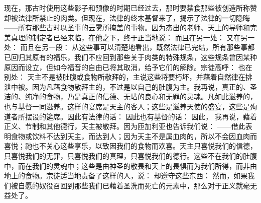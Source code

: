 现在，那古时使用这些影子和预像的时期已经过去，那时要禁食那些被创造所称赞却被法律所禁止的肉类。但现在，法律的终末基督来了，揭示了法律的一切隐晦——所有那些古时以圣事的云雾所掩盖的事物。因为杰出的老师、天上的导师和完美真理的制定者已经来临，在他之下，终于正当地说：  而且在另一处：  又在另一处： 而且在另一段：  从这些事可以清楚地看出，既然法律已完结，所有那些事都已回归其原有的福乐，我们不应回到那些关于肉类的特殊规条，这些规条曾因某种原因而设立，但如今福音的自由已将其取消，给予它们的解除。宗徒高呼：  也在别处：  天主不是被肚腹或食物所敬拜的，主说这些将要朽坏，并藉着自然律在排泄中被。因为凡藉食物敬拜主的，不过是以自己的肚腹为主。我再说，真正的、圣洁的、纯净的食物，乃是真正的信德、无玷的良心和无罪的灵魂。凡如此滋养的，也与基督一同滋养。这样的宴席是天主的客人；这些是滋养天使的盛宴，这些是殉道者所摆设的筵席。因此有法律的话：  因此也有基督的话：  因此，  我再说，藉着正义、节制和其他德行，天主被敬拜。因为匝加利亚也告诉我们说： ——借此表明食物或饮料不达到天主，而达到人；因为天主不是属血肉的，所以不会因血肉而喜悦；祂也不关心这些享乐，以致因我们的食物而欢喜。天主只喜悦我们的信德，只喜悦我们的无罪，只喜悦我们的真理，只喜悦我们的德行。这些不在我们的肚腹中，而在我们的灵魂中；这些是由神圣的敬畏和天上的畏惧而为我们所得，而非由地上的食物。宗徒适当地责备了这样的人，说：  却遵守这些东西：  然而，如果我们被自愿的奴役召回到那些我们已藉着圣洗而死亡的元素中，那么对于正义就毫无益处了。\par

